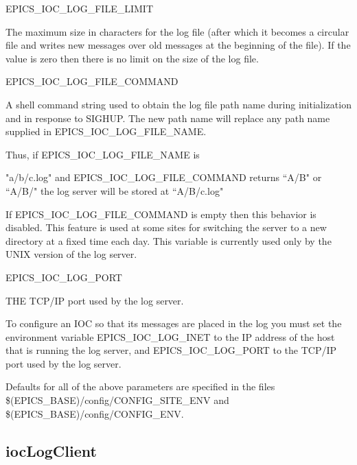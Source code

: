 \begin{description}\item {}EPICS\_IOC\_LOG\_FILE\_LIMIT

\end{description}The maximum size in characters for the log file (after which it becomes a circular file and writes new 
messages over old  messages at the beginning of the file). If the value is zero then there is no limit on the 
size of the log file. 

\begin{description}\item {}EPICS\_IOC\_LOG\_FILE\_COMMAND

\end{description}A shell command string used to obtain the log file path name during initialization and in response to 
SIGHUP. The new path name will replace any path name supplied in EPICS\_IOC\_LOG\_FILE\_NAME.

Thus, if EPICS\_IOC\_LOG\_FILE\_NAME is 

"a/b/c.log" and EPICS\_IOC\_LOG\_FILE\_COMMAND returns ``A/B" or ``A/B/" the log server will be stored 
at ``A/B/c.log"

If EPICS\_IOC\_LOG\_FILE\_COMMAND is empty then this behavior is disabled. This feature is used at 
some sites for switching the server to a new directory at a fixed time each day. This variable is currently 
used only by the UNIX version of the log server.

\begin{description}\item {}EPICS\_IOC\_LOG\_PORT

\end{description}THE TCP/IP port used by the log server.

To configure an IOC so that its messages are placed in the log you must set the environment variable 
EPICS\_IOC\_LOG\_INET to the IP address of the host that is running the log server, and EPICS\_IOC\_LOG\_PORT to the 
TCP/IP port used by the log server.

Defaults for all of the above parameters are specified in  the files \$(EPICS\_BASE)/config/CONFIG\_SITE\_ENV and 
\$(EPICS\_BASE)/config/CONFIG\_ENV.

\subsection{iocLogClient}


